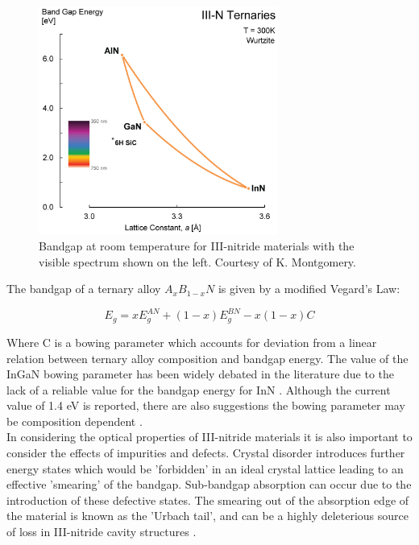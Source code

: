 \begin{figure}[h]
	\centering
	\includegraphics[width=0.7\textwidth]{Figs/Ch1/III-N-Ternaries-update.jpg}
	\caption {Bandgap at room temperature for III-nitride materials with the visible spectrum shown on the left. Courtesy of K. Montgomery.}
	\label{bgap}
\end{figure}
\FloatBarrier

The bandgap of a ternary alloy $A_{x}B_{1-x}N$ is given by a modified Vegard's Law:

\begin{equation}
E_{g} = x E_{g}^{AN} + (1-x)E_{g}^{BN}-x(1-x)C
\end{equation}

Where C is a bowing parameter which accounts for deviation from a linear relation between ternary alloy composition and bandgap energy. The value of the InGaN bowing parameter has been widely debated in the literature due to the lack of a reliable value for the bandgap energy for InN \cite{Vurgaftman2003}. Although the current value of 1.4 eV is reported, there are also suggestions the bowing parameter may be composition dependent \cite{Wu2002,McCluskey2003,Moses2010}.\\
In considering the optical properties of III-nitride materials it is also important to consider the effects of impurities and defects. Crystal disorder introduces further energy states which would be 'forbidden' in an ideal crystal lattice leading to an effective 'smearing' of the bandgap. Sub-bandgap absorption can occur due to the introduction of these defective states. The smearing out of the absorption edge of the material is known as the 'Urbach tail', and can be a highly deleterious source of loss in III-nitride cavity structures \cite{Puchtler2015}. 


